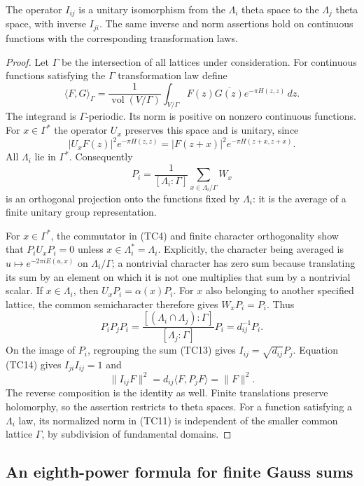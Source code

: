 \begin{lemma}\label{tc-unitary-intertwiner}
The operator $I_{ij}$ is a unitary isomorphism from the
$\Lambda_i$ theta space to the $\Lambda_j$ theta space, with
inverse $I_{ji}$.  The same inverse and norm assertions hold on
continuous functions with the corresponding transformation laws.
\end{lemma}
\begin{proof}
Let $\Gamma$ be the intersection of all lattices under
consideration.  For continuous functions satisfying the
$\Gamma$ transformation law define
\[
 \langle F,G\rangle_\Gamma
  =\frac1{\operatorname{vol}(V/\Gamma)}
    \int_{V/\Gamma}F(z)\overline{G(z)}
                        e^{-\pi H(z,z)}\,dz.
 \tag{TC11}
\]
The integrand is $\Gamma$-periodic.  Its norm is positive on
nonzero continuous functions.  For $x\in\Gamma^*$ the operator
$U_x$ preserves this space and is unitary, since
\[
 |U_xF(z)|^2e^{-\pi H(z,z)}
       =|F(z+x)|^2e^{-\pi H(z+x,z+x)}.
 \tag{TC12}
\]
All $\Lambda_i$ lie in $\Gamma^*$.
Consequently
\[
       P_i=\frac1{[\Lambda_i:\Gamma]}
                   \sum_{x\in\Lambda_i/\Gamma}W_x
 \tag{TC13}
\]
is an orthogonal projection onto the functions fixed by
$\Lambda_i$: it is the average of a finite unitary group
representation.

For $x\in\Gamma^*$, the commutator in (TC4) and finite
character orthogonality show that $P_iU_xP_i=0$ unless
$x\in\Lambda_i^*=\Lambda_i$.
Explicitly, the character being averaged is
$u\mapsto e^{-2\pi iE(u,x)}$ on $\Lambda_i/\Gamma$;
a nontrivial character has zero sum because translating its
sum by an element on which it is not one multiplies that sum
by a nontrivial scalar.
If $x\in\Lambda_i$, then $U_xP_i=\alpha(x)P_i$.
For $x$ also belonging to another specified lattice, the
common semicharacter therefore gives $W_xP_i=P_i$.
Thus
\[
 P_iP_jP_i=
 \frac{[(\Lambda_i\cap\Lambda_j):\Gamma]}
      {[\Lambda_j:\Gamma]}P_i=d_{ij}^{-1}P_i.
 \tag{TC14}
\]
On the image of $P_i$, regrouping the sum (TC13) gives
$I_{ij}=\sqrt{d_{ij}}P_j$.
Equation (TC14) gives $I_{ji}I_{ij}=1$ and
\[
 \|I_{ij}F\|^2=d_{ij}\langle F,P_jF\rangle
             =\|F\|^2.
\]
The reverse composition is the identity as well.
Finite translations preserve holomorphy, so the assertion
restricts to theta spaces.  For a function satisfying a
$\Lambda_i$ law, its normalized norm in (TC11) is independent
of the smaller common lattice $\Gamma$, by subdivision of
fundamental domains.
\end{proof}

\subsection{An eighth-power formula for finite Gauss sums}

